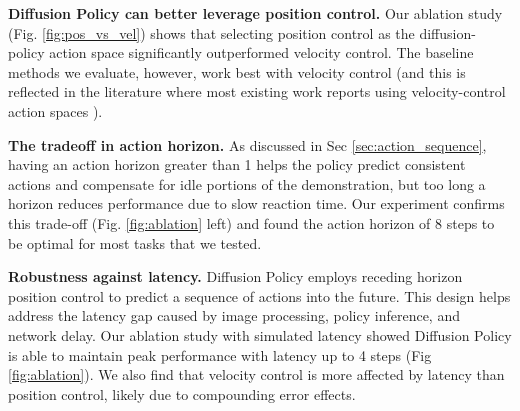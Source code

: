 \documentclass[Afour,sageh,times]{sagej}
\begin{document}
\textbf{Diffusion Policy can better leverage position control.}
\label{sec:eval_pos_vs_vel}
Our ablation study (Fig. \ref{fig:pos_vs_vel}) shows that selecting position control as the diffusion-policy action space significantly outperformed velocity control. The baseline methods we evaluate, however, work best with velocity control (and this is reflected in the literature where most existing work reports using velocity-control action spaces \cite{robomimic, bet, zhang2018deep, florence2019self, mandlekar2020learning, mandlekar2020iris}).



\textbf{The tradeoff in action horizon.}
As discussed in Sec \ref{sec:action_sequence}, 
having an action horizon greater than 1 helps the policy predict consistent actions and compensate for idle portions of the demonstration, but too long a horizon reduces performance due to slow reaction time. Our experiment confirms this trade-off (Fig. \ref{fig:ablation} left) and found the action horizon of 8 steps to be optimal for most tasks that we tested. 

\textbf{Robustness against latency.}
Diffusion Policy employs receding horizon position control to predict a sequence of actions into the future. This design helps address the latency gap caused by image processing, policy inference, and network delay. Our ablation study with simulated latency showed Diffusion Policy is able to maintain peak performance with latency up to 4 steps (Fig \ref{fig:ablation}). We also find that velocity control is more affected by latency than position control, likely due to compounding error effects.
\end{document}
